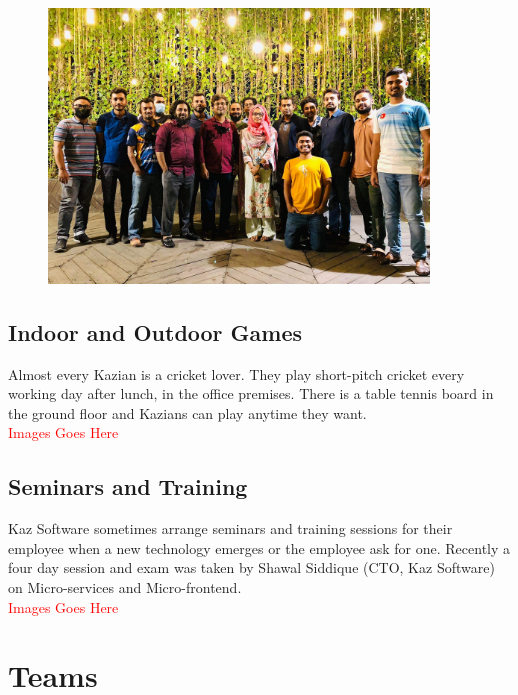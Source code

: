 \begin{figure}[h]
    \begin{center}
        \includegraphics[width=0.9\textwidth]{images/Chapter2/green_lounge.jpeg}
        \label{fig:CEO_Tour}
    \end{center}
\end{figure}

\subsection{Indoor and Outdoor Games}

Almost every Kazian is a cricket lover.
They play short-pitch cricket every working day after lunch, in the office premises.
There is a table tennis board in the ground floor and Kazians can play anytime they want.
\\

\textcolor{red}{\LARGE Images Goes Here}

\subsection{Seminars and Training}

Kaz Software sometimes arrange seminars and training sessions for their employee when a new technology emerges or the employee ask for one.
Recently a four day session and exam was taken by Shawal Siddique (CTO, Kaz Software) on Micro-services and Micro-frontend.
\\

\textcolor{red}{\LARGE Images Goes Here}

\section{Teams}

